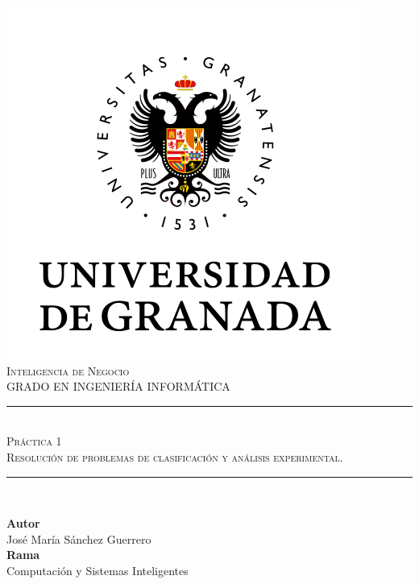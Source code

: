 \documentclass[11pt,a4paper]{article}
\newcommand{\asignatura}{Inteligencia de Negocio}
\newcommand{\autor}{José María Sánchez Guerrero}
\newcommand{\titulo}{Práctica 1}
\newcommand{\subtitulo}{Resolución de problemas de clasificación y análisis experimental.}
\begin{document}

\begin{titlepage}

\begin{minipage}{\textwidth}

\centering

\includegraphics[scale=0.5]{img/ugr.png}\\

\textsc{\Large \asignatura{}\\[0.2cm]}
\textsc{GRADO EN INGENIERÍA INFORMÁTICA}\\[1cm]

\noindent\rule[-1ex]{\textwidth}{1pt}\\[1.5ex]
\textsc{{\Huge \titulo\\[0.5ex]}}
\textsc{{\Large \subtitulo\\}}
\noindent\rule[-1ex]{\textwidth}{2pt}\\[3.5ex]

\end{minipage}

\vspace{0.5cm}

\begin{minipage}{\textwidth}

\centering

\textbf{Autor}\\ {\autor{}}\\[2.5ex]
\textbf{Rama}\\ {Computación y Sistemas Inteligentes}\\[2.5ex]
\vspace{0.3cm}


\end{minipage}
\end{titlepage}
\end{document}
